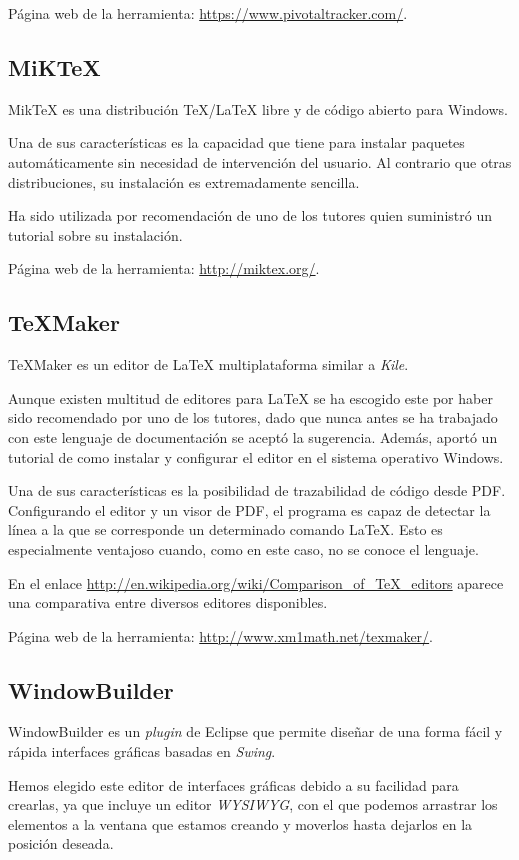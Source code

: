 Página web de la herramienta: \url{https://www.pivotaltracker.com/}.


\subsection{MiK\TeX{}}
Mik\TeX{} es una distribución \TeX{}/\LaTeX{} libre y de código abierto para Windows.

Una de sus características es la capacidad que tiene para instalar paquetes automáticamente sin necesidad de intervención del usuario. Al contrario que otras distribuciones, su instalación es extremadamente sencilla.

Ha sido utilizada por recomendación de uno de los tutores quien suministró un tutorial sobre su instalación.

Página web de la herramienta: \url{http://miktex.org/}.


\subsection{\TeX{}Maker}
\TeX{}Maker es un editor de \LaTeX{} multiplataforma similar a \textit{Kile}.

Aunque existen multitud de editores para \LaTeX{} se ha escogido este por haber sido recomendado por uno de los tutores, dado que nunca antes se ha trabajado con este lenguaje de documentación se aceptó la sugerencia. Además, aportó un tutorial de como instalar y configurar el editor en el sistema operativo Windows.

Una de sus características es la posibilidad de trazabilidad de código desde PDF. Configurando el editor y un visor de PDF, el programa es capaz de detectar la línea a la que se corresponde un determinado comando \LaTeX{}. Esto es especialmente ventajoso cuando, como en este caso, no se conoce el lenguaje.

En el enlace \url{http://en.wikipedia.org/wiki/Comparison_of_TeX_editors} aparece una comparativa entre diversos editores disponibles.

Página web de la herramienta: \url{http://www.xm1math.net/texmaker/}.

\subsection{WindowBuilder}
WindowBuilder es un \textit{plugin} de Eclipse que permite diseñar de una forma fácil y rápida interfaces gráficas basadas en \textit{Swing}.

Hemos elegido este editor de interfaces gráficas debido a su facilidad para crearlas, ya que incluye un editor \textit{WYSIWYG}, con el que podemos arrastrar los elementos a la ventana que estamos creando y moverlos hasta dejarlos en la posición deseada.

